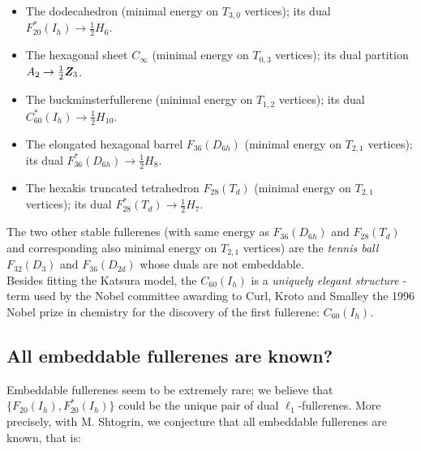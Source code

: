 \begin{itemize}
\item[ ]
The dodecahedron (minimal energy on $T_{3,0}$ vertices);
its dual $F^*_{20}(I_h)\rightarrow\frac{1}{2}H_{6}$.

\item[ ]
The hexagonal sheet $C_{\infty}$ (minimal energy on $T_{0,3}$ vertices);
its dual partition $A_2\rightarrow\frac{1}{2}Z\hspace{-2.5mm}Z_{3}$.

\item[ ]
The buckminsterfullerene (minimal energy on $T_{1,2}$ vertices);
its dual $C^*_{60}(I_h)\rightarrow\frac{1}{2}H_{10}$.

\item[ ] 
The elongated hexagonal barrel $F_{36}(D_{6h})$
(minimal energy on $T_{2,1}$ vertices);
its dual $F^*_{36}(D_{6h})\rightarrow\frac{1}{2}H_{8}$.

\item[ ] 
The hexakis truncated tetrahedron $F_{28}(T_d)$
(minimal energy on $T_{2,1}$ vertices);
its dual $F^*_{28}(T_d)\rightarrow\frac{1}{2}H_{7}$.
\end{itemize}
The two other stable fullerenes (with same energy as $F_{36}(D_{6h})$ 
and $F_{28}(T_d)$ and corresponding also minimal energy on $T_{2,1}$ vertices)
are the {\it tennis ball} $F_{32}(D_{3})$ and 
$F_{36}(D_{2d})$ whose duals are not embeddable.\\

Besides fitting the Katsura model, the $C_{60}(I_h)$ is a {\it uniquely elegant structure}
- term %
used by the Nobel committee awarding to {\sc Curl}, {\sc Kroto} and
{\sc Smalley} the 1996 Nobel prize in chemistry for the discovery of the first
fullerene: $C_{60}(I_h)$.

\subsection{All embeddable fullerenes are known?}
Embeddable fullerenes seem to be extremely rare; we believe that $\{F_{20}(I_h),F^*_{20}(I_h)\}$ 
could be the unique pair of dual $\ell_1$-fullerenes. More precisely, with {\sc M. Shtogrin}, we 
conjecture that all embeddable fullerenes are known, that is: 

